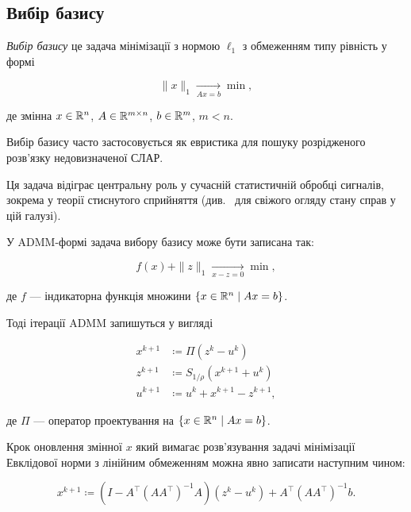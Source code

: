 \subsection{Вибір базису}

\textit{Вибір базису} це задача мінімізації з нормою $\ell_1$ з обмеженням типу рівність у формі

\begin{equation}
    \|x\|_1 \xrightarrow[A x = b]{} \min,
\end{equation}

де змінна $x \in \mathbb{R}^n$, $A \in \mathbb{R}^{m \times n}$, $b \in \mathbb{R}^m$, $m < n$. \medskip

Вибір базису часто застосовується як евристика для пошуку розрідженого розв'язку недовизначеної СЛАР. 

\begin{remark}
    Ця задача відіграє центральну роль у сучасній статистичній обробці сигналів, зокрема у теорії стиснутого сприйняття (див.~\cite{24} для свіжого огляду стану справ у цій галузі).
\end{remark}

У ADMM-формі задача вибору базису може бути записана так:

\begin{equation}
    f(x) + \|z\|_1 \xrightarrow[x - z = 0]{} \min,
\end{equation}

де $f$ --- індикаторна функція множини $\{x \in \mathbb{R}^n \mid A x = b\}$. \medskip

Тоді ітерації ADMM запишуться у вигляді

\begin{align}
    x^{k + 1} &\coloneqq \Pi \left(z^k - u^k\right) \\
    z^{k + 1} &\coloneqq S_{1 / \rho} \left(x^{k + 1} + u^k\right) \\
    u^{k + 1} &\coloneqq u^k + x^{k + 1} - z^{k + 1},
\end{align}

де $\Pi$ --- оператор проектування на $\{x \in \mathbb{R}^n \mid A x = b\}$. \medskip

Крок оновлення змінної $x$ який вимагає розв'язування задачі мінімізації Евклідової норми з лінійним обмеженням можна явно записати наступним чином:

\begin{equation}
    x^{k + 1} \coloneqq \left( I - A^\intercal (A A^\intercal)^{-1} A \right) \left(z^k - u^k\right) + A^\intercal (A A^\intercal)^{-1} b.
\end{equation}

